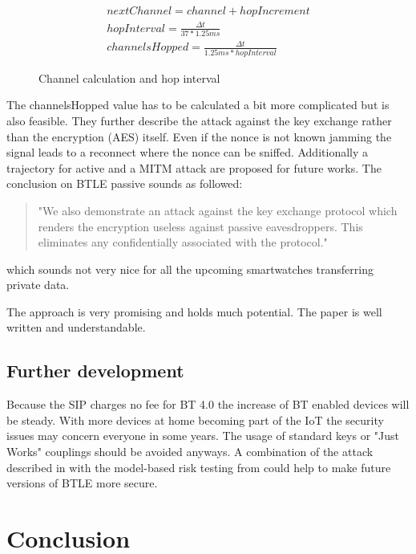 \documentclass[12pt,a4paper]{article}
\begin{document}
\begin{figure}[h]
\begin{center}
	\begin{align*}
		nextChannel = channel + hopIncrement\\
 		hopInterval = \frac{\Delta t}{37 * 1.25ms} \\
 		channelsHopped = \frac{\Delta t}{1.25ms * hopInterval}
	\end{align*}
\caption{Channel calculation and hop interval \cite{DBLP:conf/woot/Ryan13}}
\label{le_bt_formulas}
\end{center}
\end{figure}

 The channelsHopped value has to be calculated a bit more complicated but is also feasible. They further describe the attack against the key exchange rather than the encryption (AES) itself. Even if the nonce is not known jamming the signal leads to a reconnect where the nonce can be sniffed. Additionally a trajectory for active and a MITM attack are proposed for future works.
The conclusion on BTLE passive sounds as followed:
\begin{quote}
	"We also demonstrate an attack against the key exchange protocol which renders the encryption useless against passive eavesdroppers. This eliminates any confidentially associated with the protocol."\cite{DBLP:conf/woot/Ryan13}
\end{quote}
which sounds not very nice for all the upcoming smartwatches transferring private data.

The approach is very promising and holds much potential. The paper is well written and understandable.

\subsection{Further development}
Because the SIP charges no fee for BT 4.0 the increase of BT enabled devices will be steady. With more devices at home becoming part of the IoT the security issues may concern everyone in some years. The usage of standard keys or "Just Works" couplings should be avoided anyways. A combination of the attack described in \cite{DBLP:conf/woot/Ryan13} with the model-based risk testing from \cite{DBLP:conf/automotiveSS/JakobKSGMSF12} could help to make future versions of BTLE more secure.

\section{Conclusion}
\end{document}
